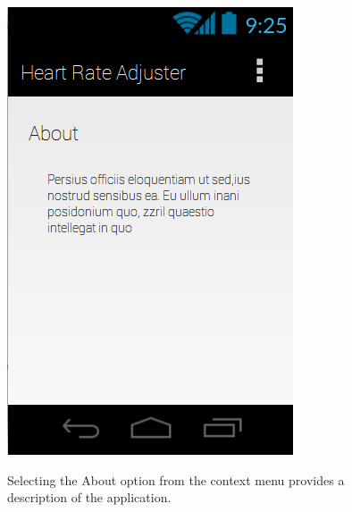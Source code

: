 \documentclass[letterpaper,english]{scrreprt}
\begin{document}
\begin{figure}[H]
	\centering
	\includegraphics{mobile_ui/5.png}\\
	\caption{Selecting the About option from the context menu provides a description of the application.}
\end{figure}
\end{document}
